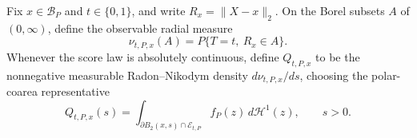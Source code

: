 Fix \(x\in\mathcal B_P\) and \(t\in\{0,1\}\), and write
\(R_x=\lVert X-x\rVert_2\).  On the Borel subsets \(A\) of
\((0,\infty)\), define the observable radial measure
\[
 \nu_{t,P,x}(A)=P\{T=t,\ R_x\in A\}.
\]
Whenever the score law is absolutely continuous, define
\(Q_{t,P,x}\) to be the nonnegative measurable Radon--Nikodym density
\(d\nu_{t,P,x}/ds\), choosing the polar-coarea representative
\[
 Q_{t,P,x}(s)=
 \int_{\partial B_2(x,s)\cap\mathcal E_{t,P}}
 f_P(z)\,d\mathcal H^1(z),\qquad s>0.
\]